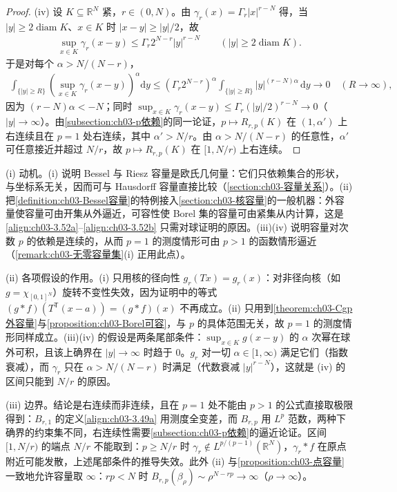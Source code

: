 \documentclass[../../main.tex]{subfiles}%
\begin{document}
\begin{proof}
(iv) 设 $K\subseteq\mathbb{R}^N$ 紧，$r\in(0,N)$。由 $\gamma_r(x)=\Gamma_r|x|^{r-N}$ 得，当 $|y|\geqslant2\operatorname{diam}K$、$x\in K$ 时 $|x-y|\geqslant|y|/2$，故
\begin{align*}
\sup_{x\in K}\gamma_r(x-y)\leqslant\Gamma_r2^{N-r}|y|^{r-N}\qquad(|y|\geqslant2\operatorname{diam}K).
\end{align*}
于是对每个 $\alpha>N/(N-r)$，
\begin{align*}
\int_{\{|y|\geqslant R\}}\left(\sup_{x\in K}\gamma_r(x-y)\right)^\alpha\mathrm{d}y
\leqslant\left(\Gamma_r2^{N-r}\right)^\alpha\int_{\{|y|\geqslant R\}}|y|^{(r-N)\alpha}\,\mathrm{d}y\longrightarrow0\quad(R\to\infty),
\end{align*}
因为 $(r-N)\alpha<-N$；同时 $\sup_{x\in K}\gamma_r(x-y)\leqslant\Gamma_r(|y|/2)^{r-N}\to0$（$|y|\to\infty$）。由\cref{subsection:ch03-p依赖}的同一论证，$p\mapsto R_{r,p}(K)$ 在 $(1,\alpha')$ 上右连续且在 $p=1$ 处右连续，其中 $\alpha'>N/r$。由 $\alpha>N/(N-r)$ 的任意性，$\alpha'$ 可任意接近并超过 $N/r$，故 $p\mapsto R_{r,p}(K)$ 在 $[1,N/r)$ 上右连续。
\end{proof}

\begin{remark}\label{remark:ch03-Bessel基本动机}
(i) 动机。(i) 说明 Bessel 与 Riesz 容量是欧氏几何量：它们只依赖集合的形状，与坐标系无关，因而可与 Hausdorff 容量直接比较（\cref{section:ch03-容量关系}）。(ii) 把\cref{definition:ch03-Bessel容量}的特例接入\cref{section:ch03-核容量}的一般机器：外容量使容量可由开集从外逼近，可容性使 Borel 集的容量可由紧集从内计算，这是\eqref{align:ch03-3.52a}--\eqref{align:ch03-3.52b} 只需对球证明的原因。(iii)(iv) 说明容量对次数 $p$ 的依赖是连续的，从而 $p=1$ 的测度情形可由 $p>1$ 的函数情形逼近（\cref{remark:ch03-无零容量集}(i) 正用此点）。

(ii) 各项假设的作用。(i) 只用核的径向性 $g_r(Tx)=g_r(x)$：对非径向核（如 $g=\chi_{[0,1]^N}$）旋转不变性失效，因为证明中的等式 $(g*f)(T^{\mathsf T}(x-a))=(g*f)(x)$ 不再成立。(ii) 只用到\cref{theorem:ch03-Cgp外容量}与\cref{proposition:ch03-Borel可容}，与 $p$ 的具体范围无关，故 $p=1$ 的测度情形同样成立。(iii)(iv) 的假设是两条尾部条件：$\sup_{x\in K}g(x-y)$ 的 $\alpha$ 次幂在球外可积，且该上确界在 $|y|\to\infty$ 时趋于 $0$。$g_r$ 对一切 $\alpha\in[1,\infty)$ 满足它们（指数衰减），而 $\gamma_r$ 只在 $\alpha>N/(N-r)$ 时满足（代数衰减 $|y|^{r-N}$），这就是 (iv) 的区间只能到 $N/r$ 的原因。

(iii) 边界。结论是右连续而非连续，且在 $p=1$ 处不能由 $p>1$ 的公式直接取极限得到：$B_{r,1}$ 的定义\eqref{align:ch03-3.49a} 用测度全变差，而 $B_{r,p}$ 用 $L^p$ 范数，两种下确界的约束集不同，右连续性需要\cref{subsection:ch03-p依赖}的逼近论证。区间 $[1,N/r)$ 的端点 $N/r$ 不能取到：$p\geqslant N/r$ 时 $\gamma_r\notin L^{p/(p-1)}(\mathbb{R}^N)$，$\gamma_r*f$ 在原点附近可能发散，上述尾部条件的推导失效。此外 (ii) 与\cref{proposition:ch03-点容量} 一致地允许容量取 $\infty$：$rp<N$ 时 $B_{r,p}(\beta_\rho)\sim\rho^{N-rp}\to\infty$（$\rho\to\infty$）。
\end{remark}
\end{document}
